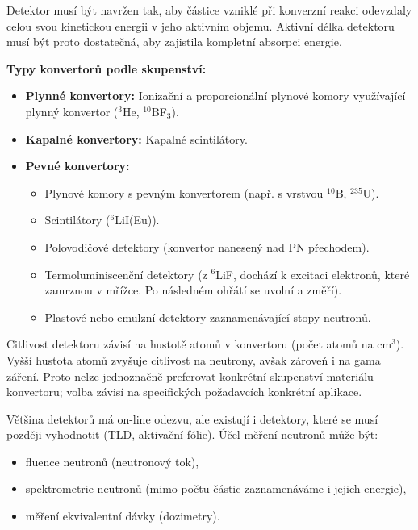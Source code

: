 Detektor musí být navržen tak, aby částice vzniklé při konverzní reakci odevzdaly celou svou kinetickou energii v jeho aktivním objemu. Aktivní délka detektoru musí být proto dostatečná, aby zajistila kompletní absorpci energie.

\textbf{Typy konvertorů podle skupenství:}

\begin{itemize}
    \item  \textbf{Plynné konvertory:} Ionizační a proporcionální plynové komory využívající plynný konvertor ($^3$He, $^{10}$BF$_3$).
    \item  \textbf{Kapalné konvertory:} Kapalné scintilátory.
    \item \textbf{Pevné konvertory:} 
    \begin{itemize}
        \item  Plynové komory s pevným konvertorem (např. s vrstvou $^{10}\text{B}$, $^{235}$U).
        \item  Scintilátory ($^6$LiI(Eu)).
        \item  Polovodičové detektory (konvertor nanesený nad PN přechodem).
        \item  Termoluminiscenční detektory (z $^6$LiF, dochází k excitaci elektronů, které zamrznou v mřížce. Po následném ohřátí se uvolní a změří).
        \item  Plastové nebo emulzní detektory zaznamenávající stopy neutronů.
    \end{itemize}
\end{itemize}

Citlivost detektoru závisí na hustotě atomů v konvertoru (počet atomů na $\text{cm}^3$). Vyšší hustota atomů zvyšuje citlivost na neutrony, avšak zároveň i na gama záření. Proto nelze jednoznačně preferovat konkrétní skupenství materiálu konvertoru; volba závisí na specifických požadavcích konkrétní aplikace.

Většina detektorů má on-line odezvu, ale existují i detektory, které se musí později vyhodnotit (TLD, aktivační fólie). Účel měření neutronů může být:

\begin{itemize}
    \item fluence neutronů (neutronový tok),
    \item spektrometrie neutronů (mimo počtu částic zaznamenáváme i jejich energie),
    \item měření ekvivalentní dávky (dozimetry).
\end{itemize}
  

